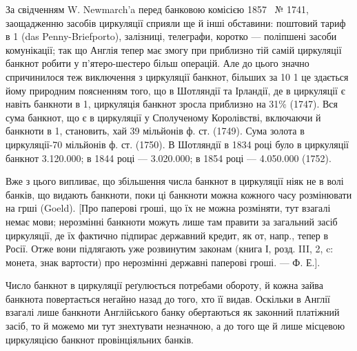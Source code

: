 За свідченням W. Newmarch’a перед банковою комісією 1857~ № 1741,
заощадженню засобів циркуляції сприяли ще й інші обставини: поштовий тариф
в 1 (das Penny-Briefporto), залізниці, телеграфи, коротко — поліпшені засоби
комунікації; так що Англія тепер має змогу при приблизно тій самій циркуляції
банкнот робити у п’ятеро-шестеро більш операцій. Але до цього значно
спричинилося теж виключення з циркуляції банкнот, більших за 10 1 це
здається йому природним поясненням того, що в Шотляндії та Ірландії, де в
циркуляції є навіть банкноти в 1, циркуляція банкнот зросла приблизно
на 31\% (1747). Вся сума банкнот, що є в циркуляції у Сполученому Королівстві,
включаючи й банкноти в 1, становить, хай 39 мільйонів ф. ст.
(1749). Сума золота в циркуляції-70 мільйонів ф. ст. (1750). В Шотляндії
в 1834 році було в циркуляції банкнот \num{3.120.000}; в 1844 році —
\num{3.020.000}; в 1854 році — \num{4.050.000} (1752).

Вже з цього випливає, що збільшення числа банкнот в циркуляції ніяк
не в волі банків, що видають банкноти, поки ці банкноти можна кожного часу
розмінювати на грші (Goeld). [Про паперові гроші, що їх не можна розміняти,
тут взагалі немає мови; нерозмінні банкноти можуть лише там правити за загальний
засіб циркуляції, де їх фактично підпирає державний кредит, як от, напр., тепер
в Росії. Отже вони підлягають уже розвинутим законам (книга І, розд. III, 2, c:
монета, знак вартости) про нерозмінні державні паперові гроші. — Ф. Е.].

Число банкнот в циркуляції реґулюється потребами обороту, й кожна
зайва банкнота повертається негайно назад до того, хто її видав. Оскільки в
Англії взагалі лише банкноти Англійського банку обертаються як законний
платіжний засіб, то й можемо ми тут знехтувати незначною, а до того ще й лише
місцевою циркуляцією банкнот провінціяльних банків.
